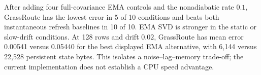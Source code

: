 After adding four full-covariance EMA controls and the nonadiabatic rate $0.1$, GrassRoute has the lowest error in 5 of 10 conditions and beats both instantaneous refresh baselines in 10 of 10. EMA SVD is stronger in the static or slow-drift conditions. At 128 rows and drift $0.02$, GrassRoute has mean error 0.00541 versus 0.05440 for the best displayed EMA alternative, with 6,144 versus 22,528 persistent state bytes. This isolates a noise--lag--memory trade-off; the current implementation does not establish a CPU speed advantage.
